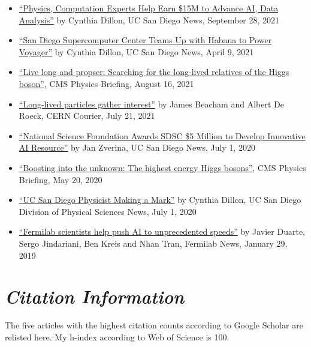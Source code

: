 \documentclass[11pt]{res}
\newcommand{\MarginText}[1]{\section{\textit{#1}}}
\begin{document}
\begin{resume}
\begin{itemize}
    \item \href{https://ucsdnews.ucsd.edu/pressrelease/physics-computation-experts-help-earn-15m-to-advance-ai-data-analysis}{``Physics, Computation Experts Help Earn \$15M to Advance AI, Data Analysis''} by Cynthia Dillon, UC San Diego News, September 28, 2021
    \item \href{https://ucsdnews.ucsd.edu/pressrelease/san-diego-supercomputer-center-teams-up-with-habana-to-power-voyager}{``San Diego Supercomputer Center Teams Up with Habana to Power Voyager''} by Cynthia Dillon, UC San Diego News, April 9, 2021
    \item \href{https://cms.cern/news/live-long-and-prosper-searching-long-lived-relatives-higgs-boson}{``Live long and propser: Searching for the long-lived relatives of the Higgs boson''}, CMS Physics Briefing, August 16, 2021
    \item \href{https://cerncourier.com/a/long-lived-particles-gather-interest/}{``Long-lived particles gather interest''} by James Beacham and Albert De Roeck, CERN Courier, July 21, 2021
    \item \href{https://ucsdnews.ucsd.edu/pressrelease/national-science-foundation-awards-sdsc-5-million-to-develop-innovative-ai-resource}{``National Science Foundation Awards SDSC \$5 Million to Develop Innovative AI Resource''} by Jan Zverina, UC San Diego News, July 1, 2020
    \item \href{https://cms.cern/news/boosting-unknown-highest-energy-higgs-bosons}{``Boosting into the unknown: The highest energy Higgs bosons''}, CMS Physics Briefing, May 20, 2020
    \item \href{https://physicalsciences.ucsd.edu/media-events/articles/2020/uc-san-diego-physicist-making-a-mark.html}{``UC San Diego Physicist Making a Mark''} by Cynthia Dillon, UC San Diego Division of Physical Sciences News, July 1, 2020
    \item \href{https://news.fnal.gov/2019/01/fermilab-scientists-help-push-ai-to-unprecedented-speeds/}{``Fermilab scientists help push AI to unprecedented speeds''} by Javier Duarte, Sergo Jindariani, Ben Kreis and Nhan Tran, Fermilab News, January 29, 2019
  \end{itemize}

  \MarginText{Citation Information}

  The five articles with the highest citation counts according to Google Scholar are relisted here.
  My h-index according to Web of Science is 100.
  \nocite{Sirunyan:2018koj}
  \nocite{Sirunyan:2016iap}
  \nocite{Duarte:2018ite}
  \nocite{Sirunyan:2018xlo}
  \nocite{Sirunyan:2019vgj}


\end{resume}
\end{document}
